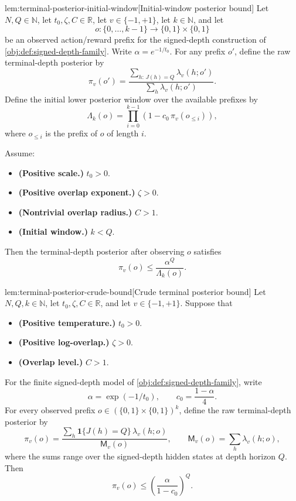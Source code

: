 \begin{lemmav}{lem:terminal-posterior-initial-window}[Initial-window posterior bound]
Let \(N,Q\in\mathbb N\), let \(t_0,\zeta,C\in\mathbb R\), let \(v\in\{-1,+1\}\), let \(k\in\mathbb N\), and let
\[
o:\{0,\ldots,k-1\}\to \{0,1\}\times\{0,1\}
\]
be an observed action/reward prefix for the signed-depth construction of \cref{obj:def:signed-depth-family}.  Write \(\alpha=e^{-1/t_0}\).  For any prefix \(o'\), define the raw terminal-depth posterior by
\[
\pi_v(o')
=
\frac{\sum_{h:\,J(h)=Q}\lambda_v(h;o')}
     {\sum_h \lambda_v(h;o')}.
\]
Define the initial lower posterior window over the available prefixes by
\[
\Lambda_k(o)
=
\prod_{i=0}^{k-1}
\left(1-c_0\,\pi_v(o_{\le i})\right),
\]
where \(o_{\le i}\) is the prefix of \(o\) of length \(i\).

Assume:
\begin{itemize}
\item \textbf{(Positive scale.)} \(t_0>0\).
\item \textbf{(Positive overlap exponent.)} \(\zeta>0\).
\item \textbf{(Nontrivial overlap radius.)} \(C>1\).
\item \textbf{(Initial window.)} \(k<Q\).
\end{itemize}
Then the terminal-depth posterior after observing \(o\) satisfies
\[
\pi_v(o)\le \frac{\alpha^Q}{\Lambda_k(o)}.
\]
\end{lemmav}

\begin{lemmav}{lem:terminal-posterior-crude-bound}[Crude terminal posterior bound]
Let \(N,Q,k\in\mathbb N\), let \(t_0,\zeta,C\in\mathbb R\), and let \(v\in\{-1,+1\}\). Suppose that
\begin{itemize}
\item \textbf{(Positive temperature.)} \(t_0>0\).
\item \textbf{(Positive log-overlap.)} \(\zeta>0\).
\item \textbf{(Overlap level.)} \(C>1\).
\end{itemize}
For the finite signed-depth model of \cref{obj:def:signed-depth-family}, write
\[
\alpha=\exp(-1/t_0),
\qquad
c_0=\frac{1-\alpha}{4}.
\]
For every observed prefix \(o\in(\{0,1\}\times\{0,1\})^k\), define the raw terminal-depth posterior by
\[
\pi_v(o)
=
\frac{
\sum_h \mathbf 1\{J(h)=Q\}\,\lambda_v(h;o)
}{
\mathsf M_v(o)
},
\qquad
\mathsf M_v(o)=\sum_h \lambda_v(h;o),
\]
where the sums range over the signed-depth hidden states at depth horizon \(Q\). Then
\[
\pi_v(o)
\le
\left(\frac{\alpha}{1-c_0}\right)^Q .
\]
\end{lemmav}

